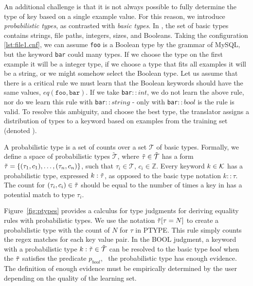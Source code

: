 An additional challenge is that it is not always possible to fully determine the type of key based on a single example value. 
For this reason, we introduce \textit{probabilistic types}, as contrasted with \textit{basic types}.
In \app, the set of basic types contains strings, file paths, integers, sizes, and Booleans. 
Taking the configuration \ref{lst:file1.cnf}, we can assume {\tt foo} is a Boolean type by the grammar of MySQL,
  but the keyword {\tt bar} could many types.
If we choose the type on the first example it will be a integer type, if we choose a type that fits all examples it will be a string, or we might somehow select the Boolean type.
Let us assume that there is a critical rule we must learn that the Boolean keywords should have the same values, $eq(\texttt{foo},\texttt{bar})$.
If we take {\tt bar}$::int$, we do not learn the above rule, nor do we learn this rule with {\tt bar}$::string$ - only with {\tt bar}$::bool$ is the rule is valid.
To resolve this ambiguity, and choose the best type, the translator assigns a distribution of types to a keyword based on examples from the training set (denoted \trainingSet).

A probabilistic type is a set of counts over a set $\mathcal{T}$ of basic types.
Formally, we define a space of probabilistic types $\tilde{\mathcal{T}}$, where $\tilde{\tau} \in \tilde{\mathcal{T}}$ has a form $\tilde{\tau}=\{(\tau_1, c_1),\ldots,(\tau_n, c_n)\}$, such that $\tau_i \in \mathcal{T}$, $c_i \in \mathbb{Z}$. 
Every keyword $k \in \mathcal{K}$ has a probabilistic type, expressed $k:\tilde{\tau}$, as opposed to the basic type notation $k::\tau$.
The count for $(\tau_i,c_i) \in \tilde{\tau}$ should be equal to the number of times a key in \trainingSet has a potential match to type $\tau_i$.

Figure~\ref{fig:ptypes} provides a calculus for type judgments for deriving equality rules with probabilistic types.
We use the notation $\tilde{\tau}[\tau=N]$ to create a probabilistic type with the count of $N$ for $\tau$ in {\scriptsize PTYPE}.
This rule simply counts the regex matches for each key value pair.
In the {\scriptsize BOOL} judgment, a keyword with a probabilistic type $k : \tilde{\tau} \in \tilde{\mathcal{T}}$ can be resolved to the basic type $bool$ when the $\tilde{\tau}$ satisfies the predicate $p_{bool}$, \ie\ the probabilistic type has enough evidence.
The definition of enough evidence must be empirically determined by the user depending on the quality of the learning set.

